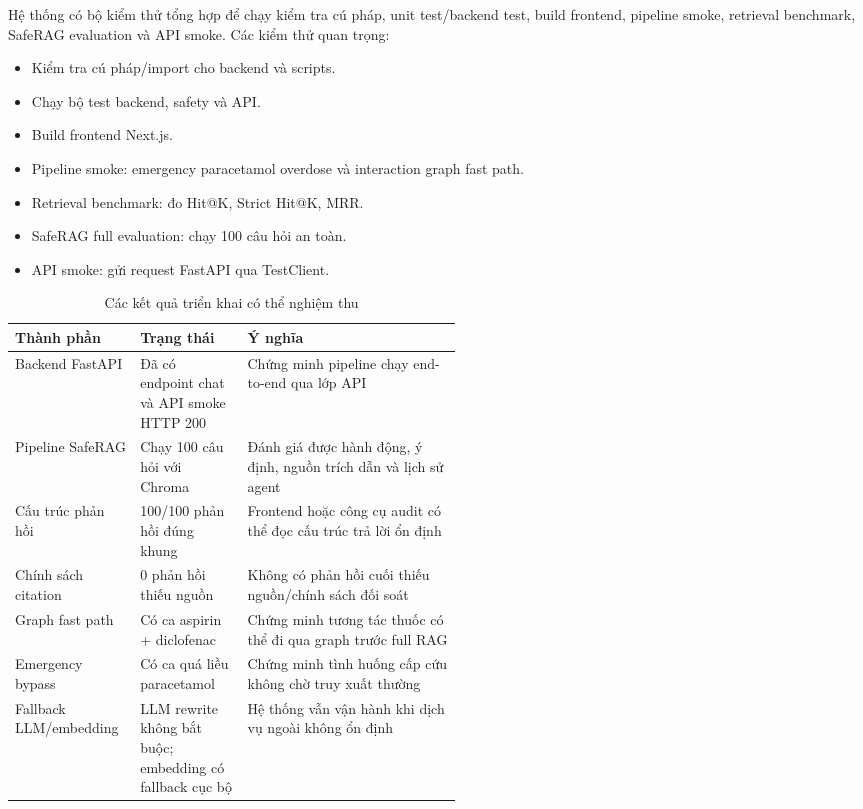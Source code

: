 Hệ thống có bộ kiểm thử tổng hợp để chạy kiểm tra cú pháp, unit test/backend test, build frontend, pipeline smoke, retrieval benchmark, SafeRAG evaluation và API smoke. Các kiểm thử quan trọng:

\begin{itemize}
  \item Kiểm tra cú pháp/import cho backend và scripts.
  \item Chạy bộ test backend, safety và API.
  \item Build frontend Next.js.
  \item Pipeline smoke: emergency paracetamol overdose và interaction graph fast path.
  \item Retrieval benchmark: đo Hit@K, Strict Hit@K, MRR.
  \item SafeRAG full evaluation: chạy 100 câu hỏi an toàn.
  \item API smoke: gửi request FastAPI qua TestClient.
\end{itemize}

\begin{table}[H]
\centering
\small
\caption{Các kết quả triển khai có thể nghiệm thu}
\begin{tabularx}{\linewidth}{p{0.28\linewidth} p{0.24\linewidth} Y}
\toprule
\textbf{Thành phần} & \textbf{Trạng thái} & \textbf{Ý nghĩa} \\
\midrule
Backend FastAPI & Đã có endpoint chat và API smoke HTTP 200 & Chứng minh pipeline chạy end-to-end qua lớp API \\
Pipeline SafeRAG & Chạy 100 câu hỏi với Chroma & Đánh giá được hành động, ý định, nguồn trích dẫn và lịch sử agent \\
Cấu trúc phản hồi & 100/100 phản hồi đúng khung & Frontend hoặc công cụ audit có thể đọc cấu trúc trả lời ổn định \\
Chính sách citation & 0 phản hồi thiếu nguồn & Không có phản hồi cuối thiếu nguồn/chính sách đối soát \\
Graph fast path & Có ca aspirin + diclofenac & Chứng minh tương tác thuốc có thể đi qua graph trước full RAG \\
Emergency bypass & Có ca quá liều paracetamol & Chứng minh tình huống cấp cứu không chờ truy xuất thường \\
Fallback LLM/embedding & LLM rewrite không bắt buộc; embedding có fallback cục bộ & Hệ thống vẫn vận hành khi dịch vụ ngoài không ổn định \\
\bottomrule
\end{tabularx}
\end{table}

